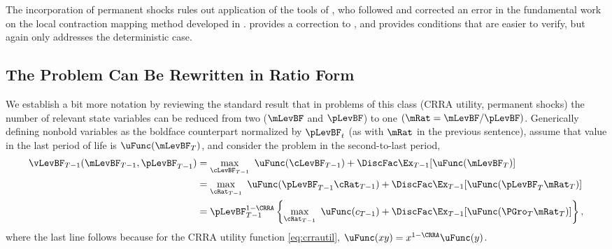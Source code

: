 \documentclass[BufferStockTheory]{subfiles}
\begin{document}
The incorporation of permanent shocks rules out application of the tools of \cite{mnUnique}, who followed and corrected an error in the fundamental work on the local contraction mapping method developed in \cite{rrExistence}.  \cite{mvExistence} provides a correction to \cite{rrExistence}, and provides conditions that are easier to verify, but again only addresses the deterministic case.  

\hypertarget{The-Problem-Can-Be-Rewritten-in-Ratio-Form}{}
\subsection{The Problem Can Be Rewritten in Ratio Form}

\label{subsec:ratio}

We establish a bit more notation by reviewing the standard result that in problems of this class (CRRA utility, permanent shocks) the number of relevant state variables can be reduced from two ($\mLevBF$ and $\pLevBF$) to one $(\mRat = \mLevBF/\pLevBF)$.  Generically defining nonbold variables as the boldface counterpart normalized by $\pLevBF_{t}$ (as with $\mRat$ in the previous sentence), assume that value in the last period of life is $\uFunc(\mLevBF_{T})$, and consider the problem in the second-to-last period,
\begin{equation}\begin{gathered}\begin{aligned}
  \vLevBF_{T-1}(\mLevBF_{T-1},\pLevBF_{T-1})  & = 
                                                \max_{\cLevBF_{T-1}}~ \uFunc(\cLevBF_{T-1}) +\DiscFac \Ex_{T-1} [ \uFunc(\mLevBF_{T})]
                                                \notag \\
                                              & =  \max_{\cRat_{T-1}}~
                                                \uFunc(\pLevBF_{T-1}\cRat_{T-1}) + \DiscFac  \Ex_{T-1} [\uFunc(\pLevBF_{T}{\mRat}
                                                _{T})]  \notag \\
                                              & = \pLevBF_{T-1}^{1-\CRRA}
                                                \left\{\max_{\cRat_{T-1}}~ \uFunc(c_{T-1}) + \DiscFac \Ex_{T-1} [ \uFunc( {\PGro}_{T}
                                                {\mRat}_{T}) ] \right\},   \label{eq:vBold}
\end{aligned}\end{gathered}\end{equation}
where the last line follows because for the CRRA utility function \eqref{eq:crrautil}, $\uFunc(xy) =
x^{1-\CRRA}\uFunc(y)$.
\end{document}
